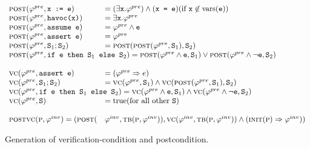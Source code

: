 
\begin{figure}
\[
\begin{array}{ll}
\postfn(\pre, \code{x := e}) &= (\exists \code{x}. \pre) \wedge (\code{x = e}) (\text{if } \code{x} \not\in \text{vars}(\code{e})) \\
\postfn(\pre, \code{havoc(x)}) &= \exists \code{x}. \pre \\
\postfn(\pre, \code{assume e}) &= \pre \wedge \code{e} \\
\postfn(\pre, \code{assert e}) &= \pre \\
\postfn(\pre, \stmtSA ; \stmtSB) &= \postfn( \postfn(\pre, \stmtSA), \stmtSB) \\
\multicolumn{2}{l}{\postfn(\pre, \code{if \expr{} then \stmtSA{} else \stmtSB{}}) = \postfn(\pre \wedge \expr, \stmtSA) \vee \postfn(\pre \wedge \neg \expr, \stmtSB)} \\
\\
\vcfn(\pre, \code{assert e}) &= (\pre \Rightarrow e) \\
\vcfn(\pre, \stmtSA ; \stmtSB) &= \vcfn(\pre, \stmtSA) \wedge \vcfn( \postfn(\pre, \stmtSA), \stmtSB) \\
\multicolumn{2}{l}{
\vcfn(\pre, \code{if \expr{} then \stmtSA{} else \stmtSB{}}) = \vcfn(\pre \wedge \expr, \stmtSA) \wedge \vcfn(\pre \wedge \neg \expr, \stmtSB)
} \\
\vcfn(\pre, \stmt) &= \text{true} (\text{for all other \stmt}) \\
\\
\mainvc{\procP}{\inv} = (\postfn(&\inv, \tbody(\proc,\inv)), \vcfn(\inv,
\tbody(\proc,\inv)) \wedge (\initstatefn(\proc) \Rightarrow \inv))
\end{array}
\]
\caption{Generation of verification-condition and postcondition.}
\label{fig:vcgen}
\end{figure}

